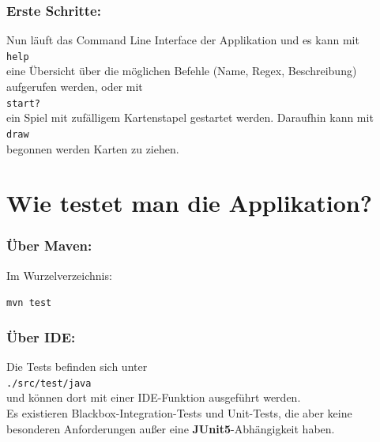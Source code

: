 \subsubsection{Erste Schritte:}

Nun läuft das Command Line Interface der Applikation und es kann mit \\
\texttt{help} \\
eine Übersicht über die möglichen Befehle (Name, Regex, Beschreibung) aufgerufen werden, 
oder mit \\
\texttt{start?} \\
ein Spiel mit zufälligem Kartenstapel gestartet werden. Daraufhin kann mit \\
\texttt{draw} \\
begonnen werden Karten zu ziehen.

\section{Wie testet man die Applikation?}

\subsubsection{Über Maven:}

Im Wurzelverzeichnis:

\texttt{mvn test}

\subsubsection{Über IDE:} 

Die Tests befinden sich unter \\
\texttt{./src/test/java} \\
und können dort mit einer IDE-Funktion ausgeführt werden. \\ 
Es existieren Blackbox-Integration-Tests und Unit-Tests, 
die aber keine besonderen Anforderungen außer eine \textbf{JUnit5}-Abhängigkeit haben.